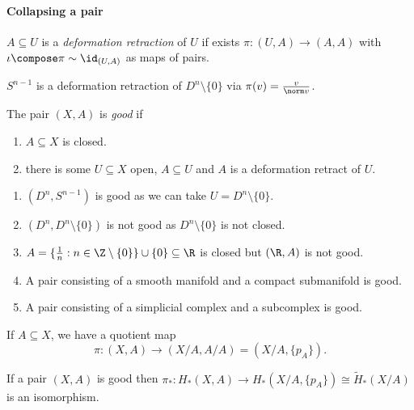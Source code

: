 \documentclass[a4paper]{article}
\begin{document}
\paragraph{Collapsing a pair}

\begin{definition}
  \(A \subseteq U\) is a \emph{deformation retraction} of \(U\) if exists \(\pi: (U, A) \to (A, A)\) with \(\iota \compose \pi \sim \id_{(U, A)}\) as maps of pairs.
\end{definition}

\begin{eg}
  \(S^{n - 1}\) is a deformation retraction of \(D^n \setminus \{0\}\) via \(\pi(v) = \frac{v}{\norm v}\).
\end{eg}

\begin{definition}
  The pair \((X, A)\) is \emph{good} if
  \begin{enumerate}
  \item \(A \subseteq X\) is closed.
  \item there is some \(U \subseteq X\) open, \(A \subseteq U\) and \(A\) is a deformation retract of \(U\).
  \end{enumerate}
\end{definition}

\begin{eg}\leavevmode
  \begin{enumerate}
  \item \((D^n, S^{n - 1})\) is good as we can take \(U = D^n \setminus \{0\}\).
  \item \((D^n, D^n \setminus \{0\})\) is not good as \(D^n \setminus \{0\}\) is not closed.
  \item \(A = \{\frac{1}{n}: n \in \Z \setminus \{0\}\} \cup \{0\} \subseteq \R\) is closed but \((\R, A)\) is not good.
  \item A pair consisting of a smooth manifold and a compact submanifold is good.
  \item A pair consisting of a simplicial complex and a subcomplex is good.
  \end{enumerate}
\end{eg}

If \(A \subseteq X\), we have a quotient map
\[
  \pi: (X, A) \to (X/A, A/A) = (X/A, \{p_A\}).
\]

\begin{theorem}
  If a pair \((X, A)\) is good then \(\pi_*: H_*(X, A) \to H_*(X/A, \{p_A\}) \cong \widetilde H_*(X/A)\) is an isomorphism.
\end{theorem}
\end{document}
